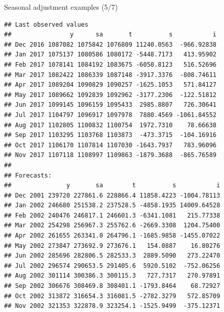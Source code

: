 \documentclass[10pt,xcolor=table,color={dvipsnames,usenames},ignorenonframetext,usepdftitle=false,french]{beamer}
\newenvironment{Shaded}{\begin{snugshade}}{\end{snugshade}}
\newcommand{\OperatorTok}[1]{\textcolor[rgb]{0.81,0.36,0.00}{\textbf{#1}}}
\newcommand{\NormalTok}[1]{#1}
\begin{document}
\begin{frame}[fragile]{Seasonal adjustment examples (5/7)}

\footnotesize

\begin{Shaded}
\end{Shaded}

\begin{verbatim}
## Last observed values
##                y      sa       t          s           i
## Dec 2016 1087082 1075842 1076809 11240.0563  -966.92838
## Jan 2017 1075137 1080586 1080172 -5448.7173   413.95902
## Feb 2017 1078141 1084192 1083675 -6050.8123   516.52696
## Mar 2017 1082422 1086339 1087148 -3917.3376  -808.74611
## Apr 2017 1089204 1090829 1090257 -1625.1053   571.84127
## May 2017 1089662 1092839 1092962 -3177.2306  -122.51812
## Jun 2017 1099145 1096159 1095433  2985.8807   726.30641
## Jul 2017 1104797 1096917 1097978  7880.4569 -1061.84552
## Aug 2017 1102805 1100832 1100754  1972.7310    78.66638
## Sep 2017 1103295 1103768 1103873  -473.3715  -104.16916
## Oct 2017 1106170 1107814 1107030 -1643.7937   783.96096
## Nov 2017 1107118 1108997 1109863 -1879.3688  -865.76589
## 
## Forecasts:
##               y       sa        t          s           i
## Dec 2001 239720 227861.6 228866.4 11858.4223 -1004.78113
## Jan 2002 246680 251538.2 237528.5 -4858.1935 14009.64528
## Feb 2002 240476 246817.1 246601.3 -6341.1081   215.77338
## Mar 2002 254298 256967.3 255762.6 -2669.3308  1204.75400
## Apr 2002 261655 263341.0 264796.1 -1685.9858 -1455.07022
## May 2002 273847 273692.9 273676.1   154.0887    16.80276
## Jun 2002 285696 282806.5 282533.3  2889.5090   273.22470
## Jul 2002 296574 290653.5 291405.6  5920.5102  -752.06256
## Aug 2002 301114 300386.3 300115.3   727.7317   270.97891
## Sep 2002 306676 308469.8 308401.1 -1793.8464    68.72927
## Oct 2002 313872 316654.3 316081.5 -2782.3279   572.85709
## Nov 2002 321353 322878.9 323254.1 -1525.9499  -375.12371
\end{verbatim}

\end{frame}
\end{document}
